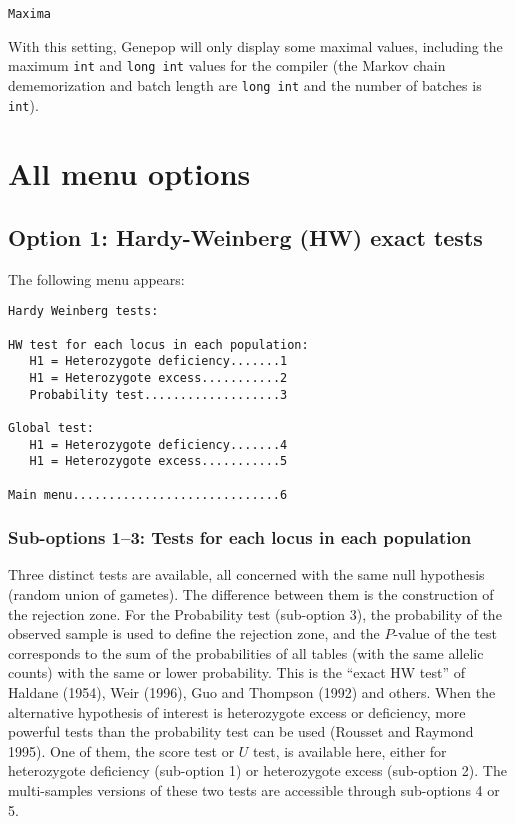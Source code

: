 \documentclass[12pt,]{book}
\theoremstyle{definition}
\theoremstyle{definition}
\theoremstyle{definition}
\theoremstyle{remark}
\begin{document}
\texttt{Maxima}

With this setting, Genepop will only display some maximal values,
including the maximum \texttt{int} and \texttt{long\ int} values for the
compiler (the Markov chain dememorization and batch length are
\texttt{long\ int} and the number of batches is \texttt{int}).

\chapter{All menu options}\label{all-menu-options}

\section{Option 1: Hardy-Weinberg (HW) exact
tests}\label{option-1-hardy-weinberg-hw-exact-tests}

The following menu appears:

\begin{verbatim}
Hardy Weinberg tests:

HW test for each locus in each population:
   H1 = Heterozygote deficiency.......1
   H1 = Heterozygote excess...........2
   Probability test...................3

Global test:
   H1 = Heterozygote deficiency.......4
   H1 = Heterozygote excess...........5

Main menu.............................6
\end{verbatim}

\subsection{Sub-options 1--3: Tests for each locus in each
population}\label{sub-options-13-tests-for-each-locus-in-each-population}

Three distinct tests are available, all concerned with the same null
hypothesis (random union of gametes). The difference between them is the
construction of the rejection zone. For the Probability test (sub-option
3), the probability of the observed sample is used to define the
rejection zone, and the \(P\)-value of the test corresponds to the sum
of the probabilities of all tables (with the same allelic counts) with
the same or lower probability. This is the ``exact HW test'' of Haldane
(1954), Weir (1996), Guo and Thompson (1992) and others. When the
alternative hypothesis of interest is heterozygote excess or deficiency,
more powerful tests than the probability test can be used (Rousset and
Raymond 1995). One of them, the score
test or \(U\) test, is
available here, either for heterozygote deficiency (sub-option 1) or
heterozygote excess (sub-option 2). The multi-samples versions of these
two tests are accessible through sub-options 4 or 5.
\end{document}
